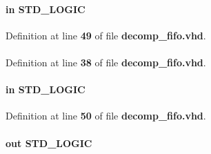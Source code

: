 \paragraph[{rdreq}]{ {\bfseries \textcolor{keywordflow}{in}\textcolor{vhdlchar}{ }} {\bfseries \textcolor{comment}{S\+T\+D\+\_\+\+L\+O\+G\+IC}\textcolor{vhdlchar}{ }} \hspace{0.3cm}{\ttfamily [Port]}}\label{classdecomp__fifo_a5b72a180053ffc44309f7598bb6ad9e4}


Definition at line {\bf 49} of file {\bf decomp\+\_\+fifo.\+vhd}.

\paragraph[{std\+\_\+logic\+\_\+1164}]{\hspace{0.3cm}{\ttfamily [Package]}}\label{classdecomp__fifo_acd03516902501cd1c7296a98e22c6fcb}


Definition at line {\bf 38} of file {\bf decomp\+\_\+fifo.\+vhd}.

\paragraph[{wrclk}]{ {\bfseries \textcolor{keywordflow}{in}\textcolor{vhdlchar}{ }} {\bfseries \textcolor{comment}{S\+T\+D\+\_\+\+L\+O\+G\+IC}\textcolor{vhdlchar}{ }} \hspace{0.3cm}{\ttfamily [Port]}}\label{classdecomp__fifo_ae8620da6f493d83c5e8f213168b6ce6b}


Definition at line {\bf 50} of file {\bf decomp\+\_\+fifo.\+vhd}.

\paragraph[{wrfull}]{ {\bfseries \textcolor{keywordflow}{out}\textcolor{vhdlchar}{ }} {\bfseries \textcolor{comment}{S\+T\+D\+\_\+\+L\+O\+G\+IC}\textcolor{vhdlchar}{ }} \hspace{0.3cm}{\ttfamily [Port]}}\label{classdecomp__fifo_a4f7f4dcba036fb2435435db13fbdea3a}


